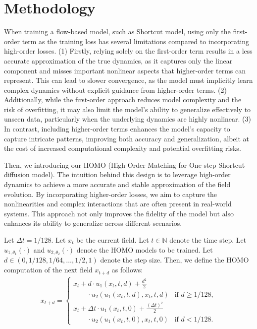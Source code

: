 \section{Methodology} \label{sec:methodology}

When training a flow-based model, such as Shortcut model, using only the first-order term as the training loss has several limitations compared to incorporating high-order losses. (1) Firstly, relying solely on the first-order term results in a less accurate approximation of the true dynamics, as it captures only the linear component and misses important nonlinear aspects that higher-order terms can represent. This can lead to slower convergence, as the model must implicitly learn complex dynamics without explicit guidance from higher-order terms. (2) Additionally, while the first-order approach reduces model complexity and the risk of overfitting, it may also limit the model's ability to generalize effectively to unseen data, particularly when the underlying dynamics are highly nonlinear. (3) In contrast, including higher-order terms enhances the model's capacity to capture intricate patterns, improving both accuracy and generalization, albeit at the cost of increased computational complexity and potential overfitting risks.

Then, we introducing our HOMO (High-Order Matching for One-step Shortcut diffusion model). The intuition behind this design is to leverage high-order dynamics to achieve a more accurate and stable approximation of the field evolution. By incorporating higher-order losses, we aim to capture the nonlinearities and complex interactions that are often present in real-world systems. This approach not only improves the fidelity of the model but also enhances its ability to generalize across different scenarios.

\begin{definition}
\label{def:HOMO_inference}
Let $\Delta t = 1 / 128$. 
Let $x_t$ be the current field. 
Let $t \in \mathbb{N}$ denote the time step. 
Let $u_{1,\theta_1}( \cdot )$ and $u_{2,\theta_2}( \cdot )$ denote the HOMO models to be trained. 
Let $d \in (0, 1 / 128, 1 / 64,\dots, 1 / 2, 1 )$ denote the step size. 
Then, we define the HOMO computation of the next field $x_{t + d}$ as follows: 
\begin{align*}
x_{t + d} = 
\begin{cases}
x_t + d \cdot u_1( x_t, t, d ) 
+ \frac{d^2}{2} \\
\qquad \cdot u_2(u_1 ( x_t, t, d), x_t, t, d ) & \text{if } d \geq 1 / 128, \\
x_t + \Delta t \cdot u_1( x_t, t, 0 )
+ \frac{(\Delta t)^2}{2} \\
\qquad \cdot u_2(u_1 ( x_t, t, 0), x_t, t, 0 ) & \text{if } d < 1 / 128.
\end{cases}
\end{align*}
\end{definition}

